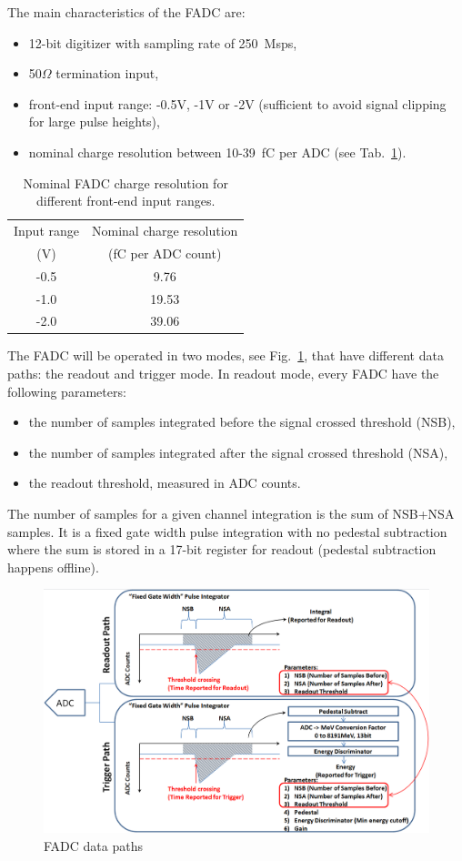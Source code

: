 The main characteristics of the FADC are:
\begin{itemize}
\item 12-bit digitizer with sampling rate of 250~Msps, 
\item 50$\Omega$ termination input, 
\item front-end input range:  -0.5V, -1V or -2V (sufficient to avoid signal clipping for large pulse heights),
\item nominal charge resolution between 10-39~fC per ADC (see Tab.~\ref{tab:charge_resolution}).
\end{itemize}
\begin{table}[h]
\centering
\begin{tabular}{|c|c|}
\hline
Input range & Nominal charge resolution\\
(V) & (fC per ADC count)\\\hline
-0.5 & 9.76  \\\hline
-1.0 & 19.53  \\\hline
-2.0 & 39.06 \\\hline
\end{tabular}
\caption{Nominal FADC charge resolution for different front-end input ranges.}
\label{tab:charge_resolution}
\end{table}
The FADC will be operated in two modes, see Fig.~\ref{fig:hps_trigger_data}, that have different data paths:  the readout and trigger mode. 
In readout mode, every FADC have the following parameters:
 \begin{itemize}
 \item the number of samples integrated before the signal crossed threshold (NSB), 
 \item the number of samples integrated after the signal crossed threshold (NSA),
 \item the readout threshold, measured in ADC counts.
 \end{itemize}
The number of samples for a given channel integration is the sum of NSB+NSA samples. It is a fixed gate width pulse integration with no pedestal subtraction where the sum is stored in a 17-bit register for readout (pedestal subtraction happens offline). 
\begin{figure}[t]
\includegraphics[scale=0.4]{daq_trigger/figures/hps_trigger_data}
\caption{\small{FADC data paths}}
\label{fig:hps_trigger_data}
\end{figure}

